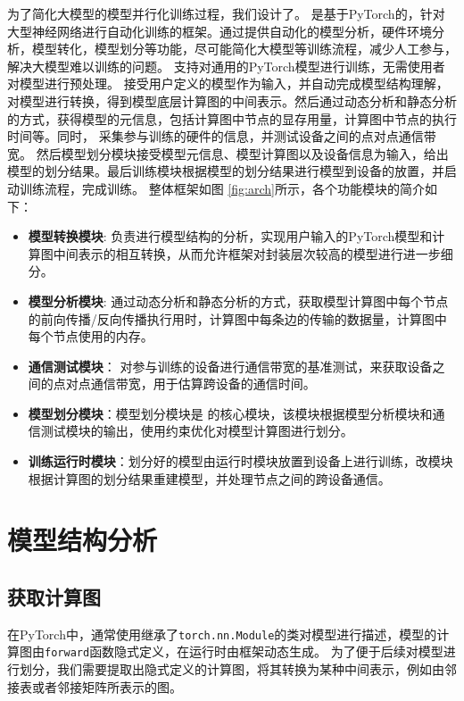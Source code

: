 为了简化大模型的模型并行化训练过程，我们设计了\sys{}。
\sys{} 是基于PyTorch的，针对大型神经网络进行自动化训练的框架。通过提供自动化的模型分析，硬件环境分析，模型转化，模型划分等功能，尽可能简化大模型等训练流程，减少人工参与，解决大模型难以训练的问题。
\sys{} 支持对通用的PyTorch模型进行训练，无需使用者对模型进行预处理。
\sys{}接受用户定义的模型作为输入，并自动完成模型结构理解，对模型进行转换，得到模型底层计算图的中间表示。然后通过动态分析和静态分析的方式，获得模型的元信息，包括计算图中节点的显存用量，计算图中节点的执行时间等。同时，\sys{} 采集参与训练的硬件的信息，并测试设备之间的点对点通信带宽。
然后模型划分模块接受模型元信息、模型计算图以及设备信息为输入，给出模型的划分结果。最后训练模块根据模型的划分结果进行模型到设备的放置，并启动训练流程，完成训练。
整体框架如图 \ref{fig:arch}所示，各个功能模块的简介如下：
\begin{itemize}
	\item \textbf{模型转换模块}: 负责进行模型结构的分析，实现用户输入的PyTorch模型和计算图中间表示的相互转换，从而允许框架对封装层次较高的模型进行进一步细分。
	\item \textbf{模型分析模块}: 通过动态分析和静态分析的方式，获取模型计算图中每个节点的前向传播/反向传播执行用时，计算图中每条边的传输的数据量，计算图中每个节点使用的内存。
	\item \textbf{通信测试模块}： 对参与训练的设备进行通信带宽的基准测试，来获取设备之间的点对点通信带宽，用于估算跨设备的通信时间。
	\item \textbf{模型划分模块}：模型划分模块是\sys{} 的核心模块，该模块根据模型分析模块和通信测试模块的输出，使用约束优化对模型计算图进行划分。
	\item \textbf{训练运行时模块}：划分好的模型由运行时模块放置到设备上进行训练，改模块根据计算图的划分结果重建模型，并处理节点之间的跨设备通信。
\end{itemize}



\section{模型结构分析}
\label{sec:convertion}

\subsection{获取计算图}
在PyTorch中，通常使用继承了\texttt{torch.nn.Module}的类对模型进行描述，模型的计算图由\texttt{forward}函数隐式定义，在运行时由框架动态生成。
为了便于后续对模型进行划分，我们需要提取出隐式定义的计算图，将其转换为某种中间表示，例如由邻接表或者邻接矩阵所表示的图。

